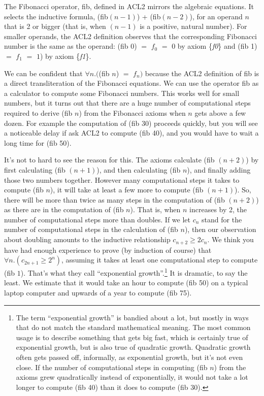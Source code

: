 The Fibonacci operator, fib, defined in ACL2
mirrors the algebraic equations.
It selects the inductive formula,
(fib$(n - 1)$) + (fib$(n - 2)$),
for an operand $n$ that is 2 or bigger
(that is, when $(n-1)$ is a positive, natural number).
For smaller operands, the ACL2 definition
observes that the corresponding Fibonacci number
is the same as the operand:
(fib 0) $=$ $f_0$ $=$ $0$ by axiom \{\emph{f0}\}
and (fib 1) $=$ $f_1$ $=$ $1$) by axiom \{\emph{f1}\}.

We can be confident that $\forall n.($(fib $n$) $=$ $f_n)$
because the ACL2 definition of fib is a direct
transliteration of the Fibonacci equations.
We can use the operator fib as a calculator
to compute some Fibonacci numbers.
This works well for small numbers,
but it turns out that there are
a huge number of
computational steps required to derive
(fib $n$) from the Fibonacci axioms when $n$ gets above a few dozen.
For example the computation of (fib 30) proceeds quickly,
but you will see a noticeable delay if ask ACL2 to compute (fib 40),
and you would have to wait a long time for (fib 50).

It's not to hard to see the reason for this.
The axioms calculate (fib $(n+2)$) by first calculating
(fib $(n+1)$), and then calculating (fib $n$), and finally
adding those two numbers together.
However many computational steps it takes to compute (fib $n$),
it will take at least a few more to compute (fib $(n+1)$).
So, there will be more than twice as many steps in the computation of (fib $(n+2)$)
as there are in the computation of (fib $n$).
That is, when $n$ increases by 2, the number of computational steps more than doubles.
If we let $c_n$ stand for the number of computational steps in the calculation
of (fib $n$), then our observation about doubling amounts to the
inductive relationship $c_{n+2} \geq 2c_n$.
We think you have had enough experience to prove (by induction of course)
that $\forall n.(c_{2n+1} \geq 2^n)$,
assuming it takes at least one computational step to compute (fib $1$).
That's what they call ``exponential growth''.\footnote{The term
``exponential growth'' is bandied about a lot, but mostly
in ways that do not match the standard mathematical meaning.
The most common usage is to describe something that
gets big fast, which is certainly true of exponential growth,
but is also true of quadratic growth.
Quadratic growth often gets passed off, informally, as exponential growth,
but it's not even close. If the number of computational steps
in computing (fib $n$) from the axioms grew quadratically instead of exponentially,
it would not take a lot longer to compute (fib 40) than it does to compute (fib 30).}
It is dramatic, to say the least. We estimate that it would take an hour to compute
(fib 50) on a typical laptop computer and upwards of a year to compute (fib 75).

